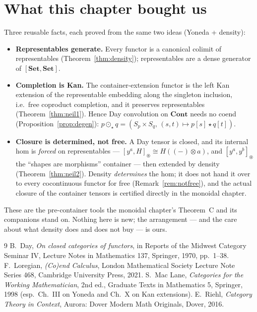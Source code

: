\documentclass[11pt]{article}
\theoremstyle{plain}
\theoremstyle{definition}
\newcommand{\Set}{\mathbf{Set}}
\newcommand{\Cont}{\mathbf{Cont}}
\newcommand{\Day}{\circledast}
\newcommand{\Dayc}{\odot}
\newcommand{\iso}{\cong}
\begin{document}
\section*{What this chapter bought us}

Three reusable facts, each proved from the same two ideas (Yoneda + density):
\begin{itemize}
\item \textbf{Representables generate.} Every functor is a canonical colimit of
representables (Theorem~\ref{thm:density}); representables are a dense generator
of $[\Set,\Set]$.
\item \textbf{Completion is Kan.} The container-extension functor is the left Kan
extension of the representable embedding along the singleton inclusion, i.e.\
free coproduct completion, and it preserves representables
(Theorem~\ref{thm:neil1}). Hence Day convolution on $\Cont$ needs no coend
(Proposition~\ref{prop:degen}): $p\Dayc_{\star}q=(S_{p}\times S_{q},\,(s,t)\mapsto
p[s]\star q[t])$.
\item \textbf{Closure is determined, not free.} A Day tensor is closed, and its
internal hom is \emph{forced} on representables --- $[y^{a},H]_{\Day}\iso
H((-)\otimes a)$, and $[y^{a},y^{b}]_{\Day}$ the ``shapes are morphisms''
container --- then extended by density (Theorem~\ref{thm:neil2}). Density
\emph{determines} the hom; it does not hand it over to every cocontinuous functor
for free (Remark~\ref{rem:notfree}), and the actual closure of the container
tensors is certified directly in the monoidal chapter.
\end{itemize}
These are the pre-container tools the monoidal chapter's Theorem~C and its
companions stand on. Nothing here is new; the arrangement --- and the care about
what density does and does not buy --- is ours.

\begin{thebibliography}{9}
 B.~Day, \emph{On closed categories of functors}, in Reports of
the Midwest Category Seminar IV, Lecture Notes in Mathematics 137, Springer,
1970, pp.~1--38.
 F.~Loregian, \emph{(Co)end Calculus}, London Mathematical
Society Lecture Note Series 468, Cambridge University Press, 2021.
\bibitem{MacLane} S.~Mac Lane, \emph{Categories for the Working Mathematician},
2nd ed., Graduate Texts in Mathematics 5, Springer, 1998 (esp.\ Ch.~III on Yoneda
and Ch.~X on Kan extensions).
 E.~Riehl, \emph{Category Theory in Context}, Aurora: Dover Modern
Math Originals, Dover, 2016.
\end{thebibliography}
\end{document}
